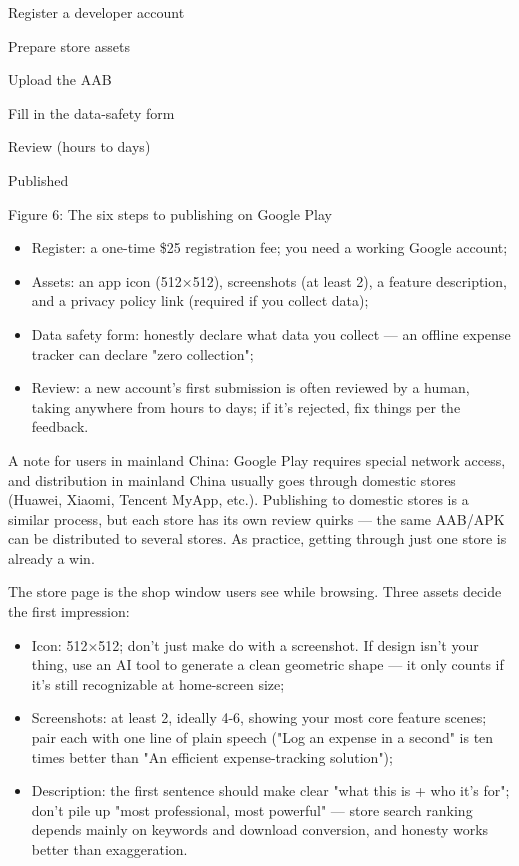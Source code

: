 Register a developer account

Prepare store assets

Upload the AAB

Fill in the data-safety form

Review (hours to days)

Published

\begin{center}\small\color{gray}Figure 6: The six steps to publishing on Google Play\end{center}

\begin{itemize}
  \item Register: a one-time \$25 registration fee; you need a working Google account;
  \item Assets: an app icon (512×512), screenshots (at least 2), a feature description, and a privacy policy link (required if you collect data);
  \item Data safety form: honestly declare what data you collect — an offline expense tracker can declare "zero collection";
  \item Review: a new account's first submission is often reviewed by a human, taking anywhere from hours to days; if it's rejected, fix things per the feedback.
\end{itemize}

A note for users in mainland China: Google Play requires special network access, and distribution in mainland China usually goes through domestic stores (Huawei, Xiaomi, Tencent MyApp, etc.). Publishing to domestic stores is a similar process, but each store has its own review quirks — the same AAB/APK can be distributed to several stores. As practice, getting through just one store is already a win.


The store page is the shop window users see while browsing. Three assets decide the first impression:

\begin{itemize}
  \item Icon: 512×512; don't just make do with a screenshot. If design isn't your thing, use an AI tool to generate a clean geometric shape — it only counts if it's still recognizable at home-screen size;
  \item Screenshots: at least 2, ideally 4-6, showing your most core feature scenes; pair each with one line of plain speech ("Log an expense in a second" is ten times better than "An efficient expense-tracking solution");
  \item Description: the first sentence should make clear "what this is + who it's for"; don't pile up "most professional, most powerful" — store search ranking depends mainly on keywords and download conversion, and honesty works better than exaggeration.
\end{itemize}


